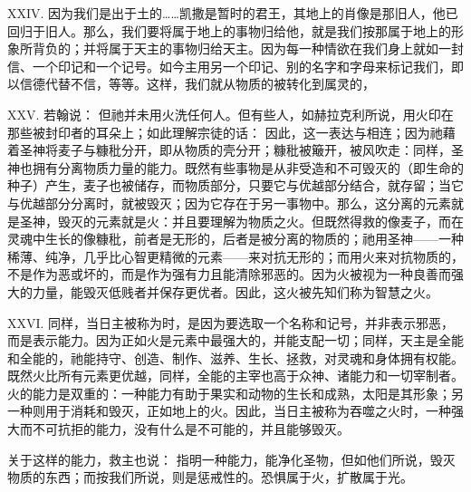 XXIV. 因为我们是出于土的……凯撒是暂时的君王，其地上的肖像是那旧人，他已回归于旧人。那么，我们要将属于地上的事物归给他，就是我们按那属于地上的形象所背负的；并将属于天主的事物归给天主。因为每一种情欲在我们身上就如一封信、一个印记和一个记号。如今主用另一个印记、别的名字和字母来标记我们，即以信德代替不信，等等。这样，我们就从物质的被转化到属灵的， \par

XXV. 若翰说：  但祂并未用火洗任何人。但有些人，如赫拉克利所说，用火印在那些被封印者的耳朵上；如此理解宗徒的话：  因此，这一表达与相连；因为祂藉着圣神将麦子与糠秕分开，即从物质的壳分开；糠秕被簸开，被风吹走：同样，圣神也拥有分离物质力量的能力。既然有些事物是从非受造和不可毁灭的（即生命的种子）产生，麦子也被储存，而物质部分，只要它与优越部分结合，就存留；当它与优越部分分离时，就被毁灭；因为它存在于另一事物中。那么，这分离的元素就是圣神，毁灭的元素就是火：并且要理解为物质之火。但既然得救的像麦子，而在灵魂中生长的像糠秕，前者是无形的，后者是被分离的物质的；祂用圣神——一种稀薄、纯净，几乎比心智更精微的元素——来对抗无形的；而用火来对抗物质的，不是作为恶或坏的，而是作为强有力且能清除邪恶的。因为火被视为一种良善而强大的力量，能毁灭低贱者并保存更优者。因此，这火被先知们称为智慧之火。\par

XXVI. 同样，当日主被称为时，是因为要选取一个名称和记号，并非表示邪恶，而是表示能力。因为正如火是元素中最强大的，并能支配一切；同样，天主是全能和全能的，祂能持守、创造、制作、滋养、生长、拯救，对灵魂和身体拥有权能。既然火比所有元素更优越，同样，全能的主宰也高于众神、诸能力和一切宰制者。火的能力是双重的：一种能力有助于果实和动物的生长和成熟，太阳是其形象；另一种则用于消耗和毁灭，正如地上的火。因此，当日主被称为吞噬之火时，一种强大而不可抗拒的能力，没有什么是不可能的，并且能够毁灭。\par

关于这样的能力，救主也说：  指明一种能力，能净化圣物，但如他们所说，毁灭物质的东西；而按我们所说，则是惩戒性的。恐惧属于火，扩散属于光。\par

